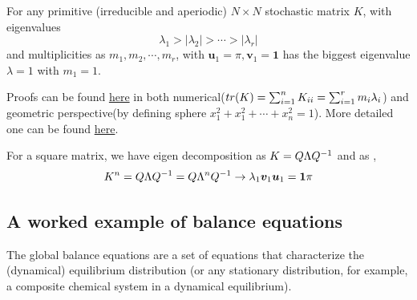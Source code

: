 \documentclass{article}
\begin{document}
\begin{theorem}
For any primitive (irreducible and aperiodic) $N\times N$ stochastic matrix $K$, with eigenvalues
\[\lambda_1>|\lambda_2|>\cdots>|\lambda_r|\] and multiplicities as $m_1,m_2,\cdots,m_r$, with $\bm{u}_1=\pi,\bm{v}_1=\bm{1}$ has the biggest eigenvalue $\lambda=1$ with $m_1=1$.
\end{theorem}
Proofs can be found \href{http://people.math.harvard.edu/~knill/teaching/math19b_2011/handouts/lecture34.pdf}{here} in both numerical($tr(K)=\sum_{i=1}^{n} K_{ii}=\sum_{i=1}^{r}m_i\lambda_i$) and geometric perspective(by defining sphere $x_1^2+x_1^2+\cdots+x_n^2=1$). More detailed one can be found \href{http://pi.math.cornell.edu/~web6720/Perron-Frobenius_Hannah\%20Cairns.pdf}{here}.

For a square matrix, we have eigen decomposition as $K=Q\Lambda Q^{-1}$ and as \asngotoinfty,
\[K^n=Q\Lambda Q^{-1}=Q\Lambda^n Q^{-1}\to \lambda_1\bm{v}_1\bm{u}_1=\bm{1}\pi\]



\subsection{A worked example of balance equations}
The global balance equations are a set of equations that characterize the (dynamical) equilibrium distribution (or any stationary distribution, for example, a composite chemical system in a dynamical equilibrium). 
\end{document}
